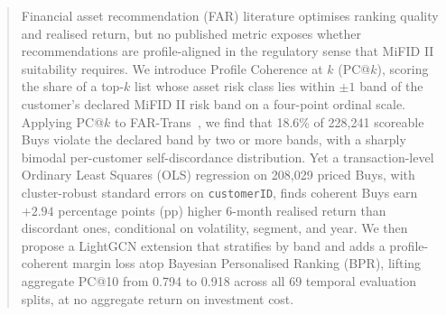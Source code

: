 \begin{abstract}
Financial asset recommendation (FAR) literature optimises ranking quality and realised return, but no published metric exposes whether recommendations are profile-aligned in the regulatory sense that MiFID II suitability requires. We introduce Profile Coherence at $k$ (PC@$k$), scoring the share of a top-$k$ list whose asset risk class lies within $\pm 1$ band of the customer's declared MiFID II risk band on a four-point ordinal scale. Applying PC@$k$ to FAR-Trans~\cite{sanzcruzado:fartrans}, we find that 18.6\% of 228{,}241 scoreable Buys violate the declared band by two or more bands, with a sharply bimodal per-customer self-discordance distribution. Yet a transaction-level Ordinary Least Squares (OLS) regression on 208{,}029 priced Buys, with cluster-robust standard errors on \texttt{customerID}, finds coherent Buys earn $+2.94$ percentage points (pp) higher 6-month realised return than discordant ones, conditional on volatility, segment, and year. We then propose a LightGCN extension that stratifies by band and adds a profile-coherent margin loss atop Bayesian Personalised Ranking (BPR), lifting aggregate PC@10 from 0.794 to 0.918 across all 69 temporal evaluation splits, at no aggregate return on investment cost.
\end{abstract}

